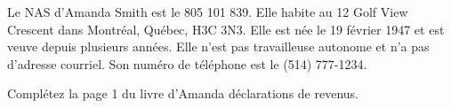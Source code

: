 Le NAS d’Amanda Smith est le 805 101 839. Elle habite au 12 Golf View Crescent dans Montréal, Québec, H3C 3N3. Elle est née le 19 février 1947 et est veuve depuis plusieurs années. Elle n’est pas travailleuse autonome et n’a pas d’adresse courriel. Son numéro de téléphone est le (514) 777-1234.

Complétez la page 1 du livre d’Amanda déclarations de revenus.